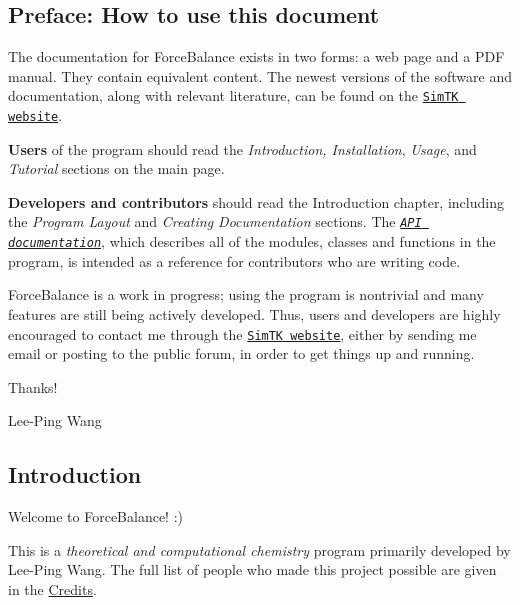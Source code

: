 \hypertarget{index_preface_sec}{}\subsection{Preface\-: How to use this document}\label{index_preface_sec}
The documentation for Force\-Balance exists in two forms\-: a web page and a P\-D\-F manual. They contain equivalent content. The newest versions of the software and documentation, along with relevant literature, can be found on the \href{https://simtk.org/home/forcebalance/}{\tt Sim\-T\-K website}.

{\bfseries Users} of the program should read the {\itshape Introduction, Installation}, {\itshape Usage}, and {\itshape Tutorial} sections on the main page.

{\bfseries Developers and contributors} should read the Introduction chapter, including the {\itshape Program Layout} and {\itshape Creating Documentation} sections. The {\itshape \href{http://leeping.github.io/forcebalance/doc/html/api/roadmap.html}{\tt A\-P\-I documentation}}, which describes all of the modules, classes and functions in the program, is intended as a reference for contributors who are writing code.

Force\-Balance is a work in progress; using the program is nontrivial and many features are still being actively developed. Thus, users and developers are highly encouraged to contact me through the \href{https://simtk.org/home/forcebalance/}{\tt Sim\-T\-K website}, either by sending me email or posting to the public forum, in order to get things up and running.

Thanks!

Lee-\/\-Ping Wang\hypertarget{index_intro_sec}{}\subsection{Introduction}\label{index_intro_sec}
Welcome to Force\-Balance! \-:)

This is a {\itshape  theoretical and computational chemistry } program primarily developed by Lee-\/\-Ping Wang. The full list of people who made this project possible are given in the \hyperlink{index_credits}{Credits}.

